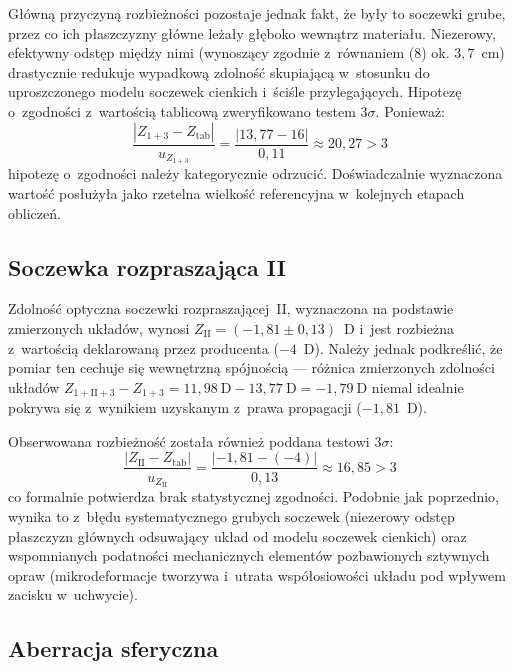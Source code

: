 \documentclass[12pt, a4paper]{article}
\begin{document}
Główną przyczyną rozbieżności pozostaje jednak fakt, że były to soczewki grube, przez co ich płaszczyzny główne leżały głęboko wewnątrz materiału. Niezerowy, efektywny odstęp między nimi (wynoszący zgodnie z~równaniem (8) ok. $3{,}7$~cm) drastycznie redukuje wypadkową zdolność skupiającą w~stosunku do uproszczonego modelu soczewek cienkich i~ściśle przylegających. Hipotezę o~zgodności z~wartością tablicową zweryfikowano testem $3\sigma$. Ponieważ:
\begin{equation}
\frac{|Z_{1+3} - Z_{\mathrm{tab}}|}{u_{Z_{1+3}}} = \frac{|13{,}77 - 16|}{0{,}11} \approx 20{,}27 > 3
\end{equation}
hipotezę o~zgodności należy kategorycznie odrzucić. Doświadczalnie wyznaczona wartość posłużyła jako rzetelna wielkość referencyjna w~kolejnych etapach obliczeń.

\subsection{Soczewka rozpraszająca II}

Zdolność optyczna soczewki rozpraszającej~II, wyznaczona na podstawie zmierzonych układów, wynosi $Z_{\mathrm{II}} = (-1{,}81\pm0{,}13)$~D i~jest rozbieżna z~wartością deklarowaną przez producenta ($-4$~D). Należy jednak podkreślić, że pomiar ten cechuje się wewnętrzną spójnością --- różnica zmierzonych zdolności układów $Z_{1+\mathrm{II}+3} - Z_{1+3} = 11{,}98~\text{D} - 13{,}77~\text{D} = -1{,}79~\text{D}$ niemal idealnie pokrywa się z~wynikiem uzyskanym z~prawa propagacji ($-1{,}81$~D). 

Obserwowana rozbieżność została również poddana testowi $3\sigma$:
\begin{equation}
\frac{|Z_{\mathrm{II}} - Z_{\mathrm{tab}}|}{u_{Z_{\mathrm{II}}}} = \frac{|-1{,}81 - (-4)|}{0{,}13} \approx 16{,}85 > 3
\end{equation}
co formalnie potwierdza brak statystycznej zgodności. Podobnie jak poprzednio, wynika to z~błędu systematycznego grubych soczewek (niezerowy odstęp płaszczyzn głównych odsuwający układ od modelu soczewek cienkich) oraz wspomnianych podatności mechanicznych elementów pozbawionych sztywnych opraw (mikrodeformacje tworzywa i~utrata współosiowości układu pod wpływem zacisku w~uchwycie).

\subsection{Aberracja sferyczna}
\end{document}
